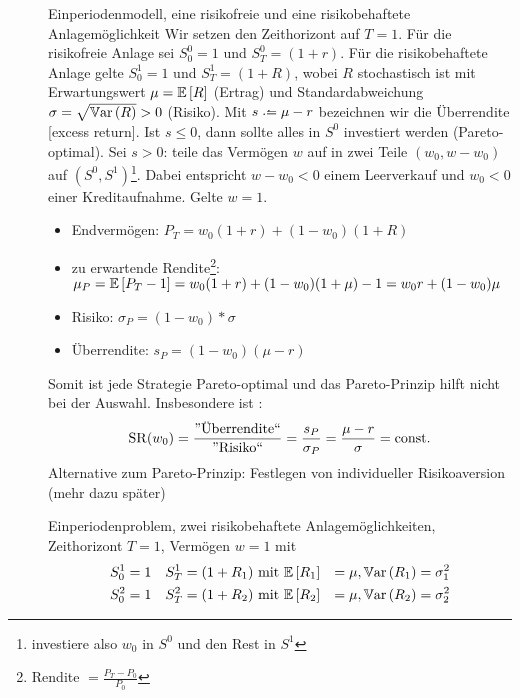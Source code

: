 \begin{description}
	\item[] Einperiodenmodell, eine risikofreie und eine risikobehaftete Anlagemöglichkeit \linebreak
	Wir setzen den Zeithorizont auf $T = 1$. Für die risikofreie Anlage sei $S_0^0 = 1$ und $S_T^0 = (1+r)$. Für die risikobehaftete Anlage gelte $S_0^1 = 1$ und $S_T^1 = (1+R)$, wobei $R$ stochastisch ist mit Erwartungswert $\mu = \EW[R]$ (Ertrag) und Standardabweichung $\sigma = \sqrt{\Var[R]} > 0$ (Risiko).
	Mit $s \defeq \mu  - r$ bezeichnen wir die Überrendite [excess return]. Ist $s \le 0$, dann sollte alles in $S^0$ investiert werden (Pareto-optimal). Sei $s > 0$: teile das Vermögen $w$ auf in zwei Teile $(w_0, w - w_0)$ auf $(S^0, S^1)$\footnote{investiere also $w_0$ in $S^0$ und den Rest in $S^1$}. Dabei entspricht $w - w_0 < 0$ einem Leerverkauf und $w_0 < 0$ einer Kreditaufnahme. Gelte $w=1$. 
	\begin{itemize}[nolistsep]
		\item Endvermögen: $P_T = w_0 (1+r) + (1-w_0) (1+R)$
		\item zu erwartende Rendite\footnote{Rendite $= \frac{P_T - P_0}{P_0}$}: $\mu_P = \EW[P_T - 1] = w_0 (1+r) + (1-w_0)(1+\mu) -1 = w_0 r + (1-w_0) \mu$
		\item Risiko:  $\sigma_P = (1-w_0) * \sigma$
		\item Überrendite: $s_P = (1-w_0) (\mu - r)$
	\end{itemize}
	Somit ist jede Strategie Pareto-optimal und das Pareto-Prinzip hilft nicht bei der Auswahl. Insbesondere ist :
	\begin{equation*}
		\SR(w_0) = \frac{\text{''Überrendite``}}{\text{''Risiko``}} = \frac{s_P}{\sigma_P} = \frac{\mu - r}{\sigma} = \text{const.}
	\end{equation*}
	Alternative zum Pareto-Prinzip: Festlegen von individueller Risikoaversion (mehr dazu später)
	\item[] Einperiodenproblem, zwei risikobehaftete Anlagemöglichkeiten, Zeithorizont $T=1$, Vermögen $w=1$ mit
	\begin{equation*}
		\begin{aligned}
		S_0^1 &= 1 & S_T^1 = (1+R_1) &\mit \EW[R_1] &= \mu, \Var[R_1] = \sigma_1^2 \\
		S_0^2 &= 1 & S_T^2 = (1+R_2) &\mit \EW[R_2] &= \mu, \Var[R_2] = \sigma_2^2
		\end{aligned}
	\end{equation*}

\end{description}
